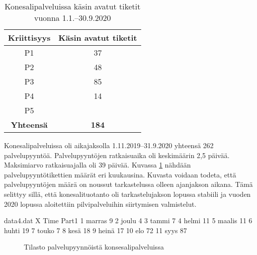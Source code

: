 \begin{table}[ht]
\centering
\begin{tabular}{||c c||} 
 \hline
 Kriittisyys & Käsin avatut tiketit \\ [0.5ex] 
 \hline\hline
 P1 & 37 \\ 
 P2 & 48 \\
 P3 & 85 \\
 P4 & 14 \\
 P5 &  \\
 \textbf{Yhteensä} & \textbf{184} \\ [1ex] 
 \hline
\end{tabular}
\caption{Konesalipalveluissa käsin avatut tiketit vuonna 1.1.--30.9.2020}
\label{table:koneautomaatti}
\end{table}

Konesalipalveluissa oli aikajaksolla 1.11.2019--31.9.2020 yhteensä 262 palvelupyyntöä. Palvelupyyntöjen ratkaisuaika oli keskimäärin 2,5 päivää. Maksimiarvo ratkaisuajalla oli 39 päivää. Kuvassa \ref{fig:konepyynto} nähdään palvelupyyntötikettien määrät eri kuukausina. Kuvasta voidaan todeta, että palvelupyyntöjen määrä on noussut tarkastelussa olleen ajanjakson aikana. Tämä selittyy sillä, että konesalituotanto oli tarkastelujakson lopussa stabiili ja vuoden 2020 lopussa aloitettiin pilvipalveluihin siirtymisen valmistelut.

\begin{filecontents}{data4.dat}
X Time  	Part1
1 marras  	9
2 joulu		4
3 tammi 	7
4 helmi		11
5 maalis	11
6 huhti		19
7 touko		7
8 kesä      18
9 heinä     17
10 elo      72
11 syys     87
\end{filecontents}

\begin{figure}[ht]
\caption{Tilasto palvelupyynnöistä konsesalipalveluissa}
\label{fig:konepyynto}
\end{figure}

